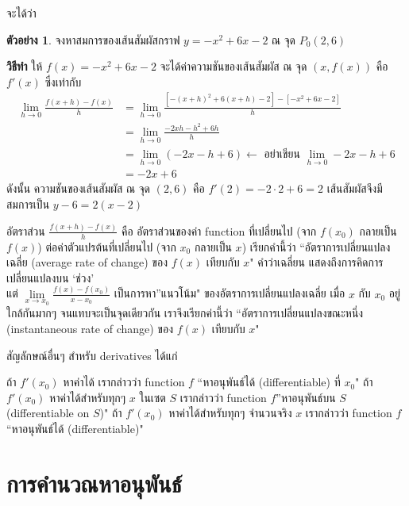 \documentclass[
]{book}
\theoremstyle{definition}
\theoremstyle{definition}
\newtheorem{example}{ตัวอย่าง}[chapter]
\theoremstyle{definition}
\theoremstyle{definition}
\theoremstyle{remark}
\begin{document}
จะได้ว่า

\begin{example}
จงหาสมการของเส้นสัมผัสกราฟ \(y = -x^2 + 6x -2\) ณ จุด \(P_0(2,6)\)
\end{example}

\textbf{วิธีทำ} ให้ \(f(x) = -x^2 + 6x -2\) จะได้ค่าความชันของเส้นสัมผัส ณ จุด \((x,f(x))\)
คือ \(f'(x)\) ซึ่งเท่ากับ \begin{equation}   \begin{aligned}
    \underset{h \rightarrow 0}{\lim}\frac{f(x+h) - f(x)}{h}
        &= \underset{h \rightarrow 0}{\lim}\frac{\left[-(x+h)^2 + 6(x+h)-2 \right]-
        \left[ -x^2 + 6x -2 \right] }{h} \\
        &=\underset{h \rightarrow 0}{\lim}\frac{-2xh-h^2+6h}{h} \\
        &=\underset{h \rightarrow 0}{\lim}(-2x-h+6)
        \leftarrow \boxed{\mbox{ อย่าเขียน $\underset{h \rightarrow 0}{\lim}-2x-h+6$}}\\
        &=-2x+6
  \end{aligned} \end{equation} ดังนั้น ความชันของเส้นสัมผัส ณ จุด \((2,6)\) คือ
\(f'(2) = -2 \cdot 2 + 6 =2\) เส้นสัมผัสจึงมีสมการเป็น \(y - 6 = 2(x-2)\)

อัตราส่วน \(\displaystyle\frac{f(x+h) - f(x)}{h}\) คือ อัตราส่วนของค่า function
ที่เปลี่ยนไป (จาก \(f(x_0)\) กลายเป็น \(f(x)\)) ต่อค่าตัวแปรต้นที่เปลี่ยนไป (จาก \(x_0\)
กลายเป็น \(x\)) เรียกคำนี้ว่า ``อัตราการเปลี่ยนแปลงเฉลี่ย (average rate of change)
ของ \(f(x)\) เทียบกับ \(x\)" คำว่าเฉลี่ยน แสดงถึงการคิดการเปลี่ยนแปลงบน `ช่วง'\\
แต่
\(\displaystyle\underset{x \rightarrow x_0}{\lim}\frac{f(x) - f(x_0)}{x-x_0}\)
เป็นการหา''แนวโน้ม" ของอัตราการเปลี่ยนแปลงเฉลี่ย เมื่อ \(x\) กับ \(x_0\) อยู่ใกล้กันมากๆ
จนแทบจะเป็นจุดเดียวกัน เราจึงเรียกค่านี้ว่า ``อัตราการเปลี่ยนแปลงขณะหนึ่ง (instantaneous
rate of change) ของ \(f(x)\) เทียบกับ \(x\)"

สัญลักษณ์อื่นๆ สำหรับ derivatives ได้แก่

ถ้า \(f'(x_0)\) หาค่าได้ เรากล่าวว่า function \(f\) ``หาอนุพันธ์ได้ (differentiable) ที่
\(x_0\)" ถ้า \(f'(x_0)\) หาค่าได้สำหรับทุกๆ \(x\) ในเซต \(S\) เรากล่าวว่า function \(f\)''หาอนุพันธ์บน \(S\) (differentiable on \(S\))" ถ้า \(f'(x_0)\) หาค่าได้สำหรับทุกๆ
จำนวนจริง \(x\) เรากล่าวว่า function \(f\) ``หาอนุพันธ์ได้ (differentiable)"

\section{การคำนวณหาอนุพันธ์}\label{uxe01uxe32uxe23uxe04uxe33uxe19uxe27uxe13uxe2buxe32uxe2duxe19uxe1euxe19uxe18}
\end{document}
